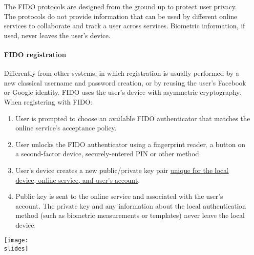 The FIDO protocols are designed from the ground up to protect user privacy. The protocols do not provide information that can be used by different online services to collaborate and track a user across services. Biometric information, if used, never leaves the user's device.




\paragraph{FIDO registration}
Differently from other systems, in which registration is usually performed by a new classical username and password creation, or by reusing the user's Facebook or Google identity, FIDO uses the user's device with asymmetric cryptography. When registering with FIDO:



\noindent
\begin{minipage}{0.4\textwidth}
  \begin{enumerate}
    \item User is prompted to choose an available FIDO authenticator that matches the online service's acceptance policy.
    \item User unlocks the FIDO authenticator using a fingerprint reader, a button on a second-factor device, securely-entered PIN or other method.
    \item User's device creates a new public/private key pair \ul{unique for the local device, online service, and user's account}.
    \item Public key is sent to the online service and associated with the user's account. The private key and any information about the local authentication method (such as biometric measurements or templates) never leave the local device.
  \end{enumerate}
\end{minipage}
\hspace{0.05\textwidth}
\begin{minipage}{0.5\textwidth}
  \centering
  \texttt{[image: \\slides]}
\end{minipage}

